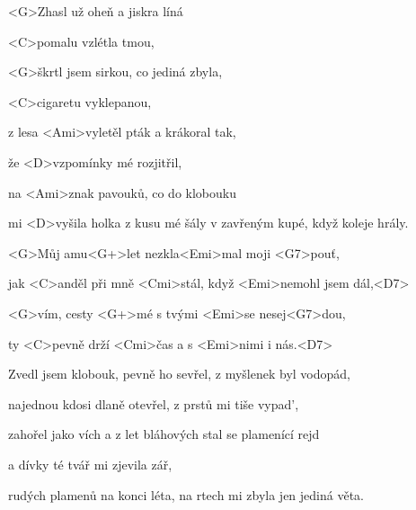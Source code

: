 

\zs
<G>Zhasl už oheň a jiskra líná

<C>pomalu vzlétla tmou,

<G>škrtl jsem sirkou, co jediná zbyla,

<C>cigaretu vyklepanou,

z lesa <Ami>vyletěl pták a krákoral tak,

že <D>vzpomínky mé rozjitřil,

na <Ami>znak pavouků, co do klobouku

mi <D>vyšila holka z kusu mé šály v zavřeným kupé, když koleje hrály.
\ks


\zr
<G>Můj amu<G+>let nezkla<Emi>mal moji <G7>pouť,

jak <C>anděl při mně <Cmi>stál, když <Emi>nemohl jsem dál,<D7>

<G>vím, cesty <G+>mé s tvými <Emi>se nesej<G7>dou,

ty <C>pevně drží <Cmi>čas a s <Emi>nimi i nás.<D7>
\kr

\zs
Zvedl jsem klobouk, pevně ho sevřel, z myšlenek byl vodopád,

najednou kdosi dlaně otevřel, z prstů mi tiše vypad',

zahořel jako vích a z let bláhových stal se plamenící rejd

a dívky té tvář mi zjevila zář,

rudých plamenů na konci léta, na rtech mi zbyla jen jediná věta.
\ks

\zr
\kr

\kp








